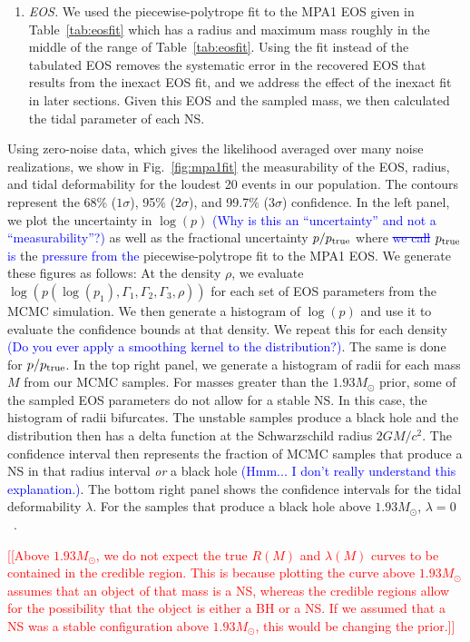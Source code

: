 \documentclass[twocolumn,prd,amssymb,aps,nofootinbib,showpacs,epsf]{revtex4}
\newcommand{\red}{\textcolor{red}}
\newcommand\les[2]{\textcolor{blue}{{#1}\sout{#2}}}
\begin{document}
\begin{enumerate}
\item \textit{EOS.} We used the piecewise-polytrope fit to the MPA1 EOS given in Table~\ref{tab:eosfit} which has a radius and maximum mass roughly in the middle of the range of Table~\ref{tab:eosfit}. Using the fit instead of the tabulated EOS removes the systematic error in the recovered EOS that results from the inexact EOS fit, and we address the effect of the inexact fit in later sections. Given this EOS and the sampled mass, we then calculated the tidal parameter of each NS.

\end{enumerate}

Using zero-noise data, which gives the likelihood averaged over many noise realizations, we show in Fig.~\ref{fig:mpa1fit} the measurability of the EOS, radius, and tidal deformability for the loudest 20 events in our population. The contours represent the 68\% ($1\sigma$), 95\% ($2\sigma$), and 99.7\% ($3\sigma$) confidence. In the left panel, we plot the uncertainty in $\log(p)$ \les{(Why is this an ``uncertainty'' and not a ``measurability''?)}{} as well as the fractional uncertainty $p/p_{\rm true}$ where \les{}{we call} $p_{\rm true}$ \les{is}{} the \les{pressure from the}{} piecewise-polytrope fit to the MPA1 EOS. We generate these figures as follows: At the density $\rho$, we evaluate $\log(p(\log(p_1), \Gamma_1, \Gamma_2, \Gamma_3, \rho))$ for each set of EOS parameters from the MCMC simulation. We then generate a histogram of $\log(p)$ and use it to evaluate the confidence bounds at that density. We repeat this for each density \les{(Do you ever apply a smoothing kernel to the distribution?)}{}. The same is done for $p/p_{\rm true}$. In the top right panel, we generate a histogram of radii for each mass $M$ from our MCMC samples. For masses greater than the $1.93M_\odot$ prior, some of the sampled EOS parameters do not allow for a stable NS. In this case, the histogram of radii bifurcates. The unstable samples produce a black hole and the distribution then has a delta function at the Schwarzschild radius $2GM/c^2$. The confidence interval then represents the fraction of MCMC samples that produce a NS in that radius interval \textit{or} a black hole \les{(Hmm... I don't really understand this explanation.)}{}. The bottom right panel shows the confidence intervals for the tidal deformability $\lambda$. For the samples that produce a black hole above $1.93M_\odot$, $\lambda=0$~\cite{BinningtonPoisson2009}.

\red{[[Above $1.93M_\odot$, we do not expect the true $R(M)$ and $\lambda(M)$ curves to be contained in the credible region. This is because plotting the curve above $1.93M_\odot$ assumes that an object of that mass is a NS, whereas the credible regions allow for the possibility that the object is either a BH or a NS. If we assumed that a NS was a stable configuration above $1.93M_\odot$, this would be changing the prior.]]}
\end{document}
